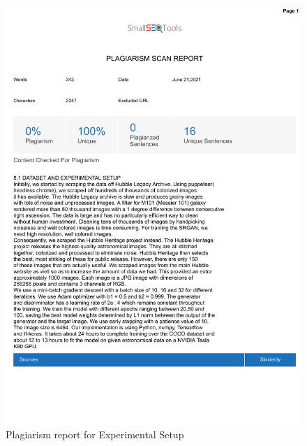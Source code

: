\documentclass[oneside,a4paper,12pt]{report}
\begin{document}
\begin{appendices}
\begin{figure}
	\centering
    \includegraphics[width=\textwidth, height=\textheight]{plagiarism/dataset_experimental_setup.pdf}
    \caption{Plagiarism report for Experimental Setup}
    \label{PlagiarismExperiment}
\end{figure}


\end{appendices}
\end{document}
